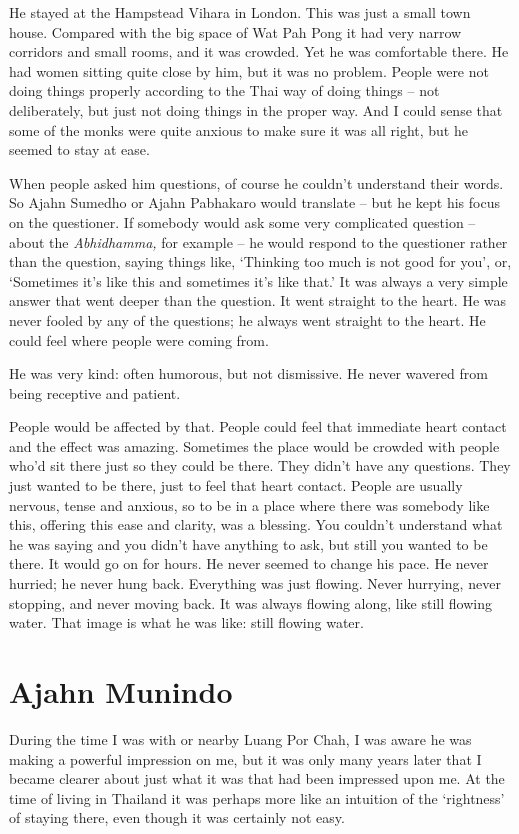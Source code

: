 He stayed at the Hampstead Vihara in London. This was just a small town
house. Compared with the big space of Wat Pah Pong it had very narrow
corridors and small rooms, and it was crowded. Yet he was comfortable
there. He had women sitting quite close by him, but it was no problem.
People were not doing things properly according to the Thai way of doing
things -- not deliberately, but just not doing things in the proper way.
And I could sense that some of the monks were quite anxious to make sure
it was all right, but he seemed to stay at ease.

When people asked him questions, of course he couldn't understand their
words. So Ajahn Sumedho or Ajahn Pabhakaro would translate -- but he
kept his focus on the questioner. If somebody would ask some very
complicated question -- about the \emph{Abhidhamma,} for example -- he
would respond to the questioner rather than the question, saying things
like, `Thinking too much is not good for you', or, `Sometimes it's like
this and sometimes it's like that.' It was always a very simple answer
that went deeper than the question. It went straight to the heart. He
was never fooled by any of the questions; he always went straight to the
heart. He could feel where people were coming from.

He was very kind: often humorous, but not dismissive. He never wavered
from being receptive and patient.

People would be affected by that. People could feel that immediate heart
contact and the effect was amazing. Sometimes the place would be crowded
with people who'd sit there just so they could be there. They didn't
have any questions. They just wanted to be there, just to feel that
heart contact. People are usually nervous, tense and anxious, so to be
in a place where there was somebody like this, offering this ease and
clarity, was a blessing. You couldn't understand what he was saying and
you didn't have anything to ask, but still you wanted to be there. It
would go on for hours. He never seemed to change his pace. He never
hurried; he never hung back. Everything was just flowing. Never
hurrying, never stopping, and never moving back. It was always flowing
along, like still flowing water. That image is what he was like: still
flowing water.

\section{Ajahn Munindo}

During the time I was with or nearby Luang Por Chah, I was aware he was
making a powerful impression on me, but it was only many years later
that I became clearer about just what it was that had been impressed
upon me. At the time of living in Thailand it was perhaps more like an
intuition of the `rightness' of staying there, even though it was
certainly not easy.

